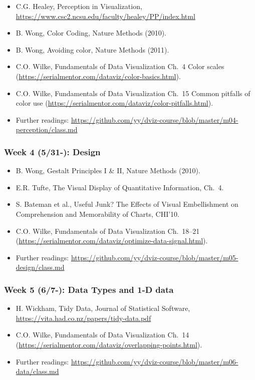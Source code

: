 \begin{itemize}\itemsep0em 
\item C.G. Healey, Perception in Visualization, \url{https://www.csc2.ncsu.edu/faculty/healey/PP/index.html}
\item B. Wong, Color Coding, Nature Methods (2010).
\item B. Wong, Avoiding color, Nature Methods (2011). 
\item C.O. Wilke, Fundamentals of Data Visualization Ch.~4 Color scales (\url{https://serialmentor.com/dataviz/color-basics.html}). 
\item C.O. Wilke, Fundamentals of Data Visualization Ch.~15 Common pitfalls of color use (\url{https://serialmentor.com/dataviz/color-pitfalls.html}).
\item Further readings: \url{https://github.com/yy/dviz-course/blob/master/m04-perception/class.md}
\end{itemize}	
\subsubsection{Week 4 (5/31-): Design }%

\begin{itemize}\itemsep0em 
\item B. Wong, Gestalt Principles I \& II, Nature Methods (2010). 
\item E.R. Tufte, The Visual Display of Quantitative Information, Ch.~4.
\item S. Bateman et al., Useful Junk? The Effects of Visual Embellishment on Comprehension and Memorability of Charts, CHI'10.
\item C.O. Wilke, Fundamentals of Data Visualization Ch.~18--21 (\url{https://serialmentor.com/dataviz/optimize-data-signal.html}). 
\item Further readings: \url{https://github.com/yy/dviz-course/blob/master/m05-design/class.md}
\end{itemize}	
\subsubsection{Week 5 (6/7-): Data Types and 1-D data } %

\begin{itemize}\itemsep0em 
\item H. Wickham, Tidy Data, Journal of Statistical Software, \url{https://vita.had.co.nz/papers/tidy-data.pdf}
\item C.O. Wilke, Fundamentals of Data Visualization Ch.~14 (\url{https://serialmentor.com/dataviz/overlapping-points.html}). 
\item Further readings: \url{https://github.com/yy/dviz-course/blob/master/m06-data/class.md}
\end{itemize}	
